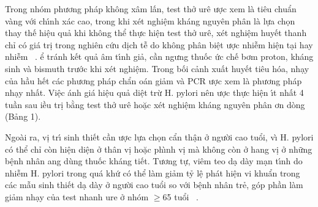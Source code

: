 \documentclass[9pt,twocolumn]{article}
\begin{document}
Trong nh{\'{o}}m phương ph\'{a}p kh{\^o}ng x\^{a}m lấn, test thở ur{\^{e}} \text{\dj}ược xem l\`{a} ti{\^{e}}u chuẩn v\`{a}ng với  ch\'{\i}nh x\'{a}c cao, trong khi x{\'e}t nghi{\^{\d{e}}}m kh\'{a}ng nguy{\^{e}}n ph\^{a}n l\`{a} lựa ch\d{o}n thay th{{\'{\^{e}}}} hi{\^{\d{e}}}u quả khi kh{\^o}ng thể thực hi{\^{\d{e}}}n test thở ur{\^{e}}, x{\'e}t nghi{\^{\d{e}}}m huy{{\'{\^{e}}}}t thanh chỉ c{\'{o}} gi\'{a} tr\d{i} trong nghi{\^{e}}n cứu d\d{i}ch t{\~{\^e}} do kh{\^o}ng ph\^{a}n bi{\^{\d{e}}}t \text{\dj}ược nhi{\~{\^e}}m hi{\^{\d{e}}}n t{\d{a}}i hay  nhi{\~{\^e}}m\unskip~\cite{2901310:34531808,2901310:34531813,2901310:34531815} . \text{\DJ}ể tr\'{a}nh k{{\'{\^{e}}}}t quả \^{a}m t\'{\i}nh giả, cần ngưng thuốc ức ch{{\'{\^{e}}}} bơm proton, kh\'{a}ng sinh v\`{a} bismuth trước khi x{\'e}t nghi{\^{\d{e}}}m. Trong bối cảnh xuất huy{{\'{\^{e}}}}t ti{\^{e}}u h{\'{o}}a,  nh{\d{a}}y của hầu h{{\'{\^{e}}}}t c\'{a}c phương ph\'{a}p chẩn \text{\dj}o\'{a}n giảm v\`{a} PCR \text{\dj}ược xem l\`{a} phương ph\'{a}p nh{\d{a}}y nhất. Vi{\^{\d{e}}}c \text{\dj}\'{a}nh gi\'{a} hi{\^{\d{e}}}u quả di{\^{\d{e}}}t trừ H. pylori n{\^{e}}n \text{\dj}ược thực hi{\^{\d{e}}}n \'{\i}t nhất 4 tuần sau \text{\dj}iều tr\d{i} bằng test thở ur{\^{e}} hoặc x{\'e}t nghi{\^{\d{e}}}m kh\'{a}ng nguy{\^{e}}n ph\^{a}n \text{\dj}ơn d\`{o}ng\unskip~\cite{2901310:34531815}\ensuremath{^{}} (Bảng 1).

Ngo\`{a}i ra, v\d{i} tr\'{\i} sinh thi{{\'{\^{e}}}}t cần \text{\dj}ược lựa ch\d{o}n cẩn th{\^{\d{a}}}n ở người cao tuổi, v\`{\i} H. pylori c{\'{o}} thể chỉ c\`{o}n hi{\^{\d{e}}}n di{\^{\d{e}}}n ở th\^{a}n v\d{i} hoặc ph\`{\i}nh v\d{i} m\`{a} kh{\^o}ng c\`{o}n ở hang v\d{i} ở những b{\^{\d{e}}}nh nh\^{a}n \text{\dj}ang d\`{u}ng thuốc kh\'{a}ng ti{{\'{\^{e}}}}t. Tương tự, vi{\^{e}}m teo d{\d{a}} d\`{a}y m{\d{a}}n t\'{\i}nh do nhi{\~{\^e}}m H. pylori trong qu\'{a} khứ c{\'{o}} thể l\`{a}m giảm tỷ l{\^{\d{e}}} ph\'{a}t hi{\^{\d{e}}}n vi khuẩn trong c\'{a}c mẫu sinh thi{{\'{\^{e}}}}t d{\d{a}} d\`{a}y ở người cao tuổi so với b{\^{\d{e}}}nh nh\^{a}n trẻ, g{\'{o}}p phần l\`{a}m giảm  nh{\d{a}}y của test nhanh ure ở nh{\'{o}}m \ensuremath{\geq }65 tuổi\unskip~\cite{2901310:34531806} .
\end{document}
